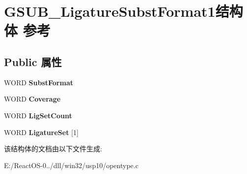 \hypertarget{struct_g_s_u_b___ligature_subst_format1}{}\section{G\+S\+U\+B\+\_\+\+Ligature\+Subst\+Format1结构体 参考}
\label{struct_g_s_u_b___ligature_subst_format1}
\subsection*{Public 属性}
\begin{DoxyCompactItemize}
\item 
\mbox{\label{struct_g_s_u_b___ligature_subst_format1_a0e719e397eda937a767958a82ca0b80b}} 
W\+O\+RD {\bfseries Subst\+Format}
\item 
\mbox{\label{struct_g_s_u_b___ligature_subst_format1_a5c6ba3e89a3a62f8c02b0d9b7270c05b}} 
W\+O\+RD {\bfseries Coverage}
\item 
\mbox{\label{struct_g_s_u_b___ligature_subst_format1_ac608b85c3899a5a316dd8a6d3bb12463}} 
W\+O\+RD {\bfseries Lig\+Set\+Count}
\item 
\mbox{\label{struct_g_s_u_b___ligature_subst_format1_a88c033ee43da8e768c5dac40fabbddd1}} 
W\+O\+RD {\bfseries Ligature\+Set} \mbox{[}1\mbox{]}
\end{DoxyCompactItemize}


该结构体的文档由以下文件生成\+:\begin{DoxyCompactItemize}
\item 
E\+:/\+React\+O\+S-\/0../dll/win32/usp10/opentype.\+c\end{DoxyCompactItemize}
